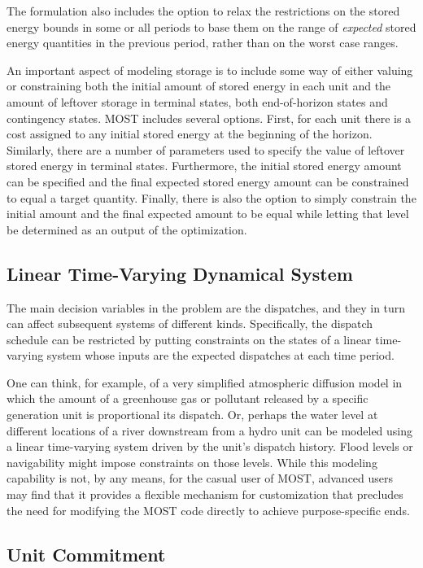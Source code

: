 \documentclass[12pt]{article}
\newcommand{\most}[0]{{MOST}}
\numberwithin{equation}{section}
\numberwithin{table}{section}
\numberwithin{figure}{section}
\begin{document}
The formulation also includes the option to relax the restrictions on the stored energy bounds in some or all periods to base them on the range of \emph{expected} stored energy quantities in the previous period, rather than on the worst case ranges.

An important aspect of modeling storage is to include some way of either valuing or constraining both the initial amount of stored energy in each unit and the amount of leftover storage in terminal states, both end-of-horizon states and contingency states. \most{} includes several options. First, for each unit there is a cost assigned to any initial stored energy at the beginning of the horizon. Similarly, there are a number of parameters used to specify the value of leftover stored energy in terminal states. Furthermore, the initial stored energy amount can be specified and the final expected stored energy amount can be constrained to equal a target quantity. Finally, there is also the option to simply constrain the initial amount and the final expected amount to be equal while letting that level be determined as an output of the optimization.

\subsection{Linear Time-Varying Dynamical System}

The main decision variables in the problem are the dispatches, and they in turn can affect subsequent systems of different kinds.
Specifically, the dispatch schedule can be restricted by putting constraints on the states of a linear time-varying system whose inputs are the expected dispatches at each time period.

One can think, for example, of a very simplified atmospheric diffusion model in which the amount of a greenhouse gas or pollutant released by a specific generation unit is proportional its dispatch.
Or, perhaps the water level at different locations of a river downstream from a hydro unit can be modeled using a linear time-varying system driven by the unit's dispatch history.
Flood levels or navigability might impose constraints on those levels.
While this modeling capability is not, by any means, for the casual user of \most{}, advanced users may find that it provides a flexible mechanism for customization that precludes the need for modifying the \most{} code directly to achieve purpose-specific ends.

\subsection{Unit Commitment}
\end{document}
